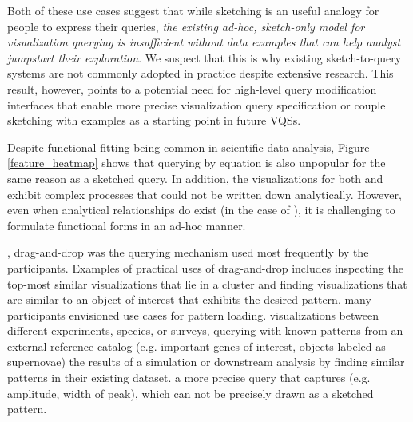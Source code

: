 {\par Both of these use cases suggest that while sketching is an useful analogy for people to express their queries, \emph{the existing ad-hoc, sketch-only model for visualization querying is insufficient without data examples that can help analyst jumpstart their exploration}. We suspect that this is why existing sketch-to-query systems are not commonly adopted in practice despite extensive research. This result, however, points to a potential need for high-level query modification interfaces that enable more precise visualization query specification or couple sketching with examples as a starting point in future VQSs.} %
\par Despite functional fitting being common in scientific data analysis, Figure \ref{feature_heatmap} shows that querying by equation is also unpopular for the same reason as a sketched query. In addition, the visualizations for both \astro and \bio exhibit complex processes that could not be written down  analytically. However, even when analytical relationships do exist (in the case of \matsci), it is challenging to formulate functional forms in an  ad-hoc manner. %
\par {}, drag-and-drop was the querying mechanism used most frequently by the participants. Examples of practical uses of drag-and-drop includes inspecting the top-most similar visualizations that lie in a cluster and finding visualizations that are similar to an object of interest that exhibits the desired pattern.  many participants envisioned use cases for pattern loading.  visualizations between different experiments, species, or surveys, querying with known patterns from an external reference catalog (e.g. important genes of interest, objects labeled as supernovae)  the results of a simulation or downstream analysis by finding similar patterns in their existing dataset.  a more precise query that captures  (e.g. amplitude, width of peak), which can not be precisely drawn as a sketched pattern. 
